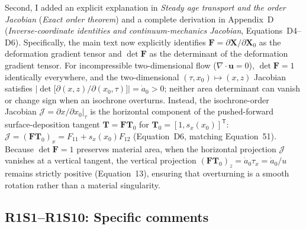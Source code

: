 \documentclass[11pt]{article}
\newcommand{\response}[1]{\noindent\textcolor{responseblue}{#1}}
\begin{document}
\medskip

\response{Second, I added an explicit explanation in \emph{Steady age transport and the order Jacobian} (\emph{Exact order theorem}) and a complete derivation in Appendix~D (\emph{Inverse-coordinate identities and continuum-mechanics Jacobian}, Equations~D4--D6). Specifically, the main text now explicitly identifies \(\bm{F}=\partial\bm{X}/\partial\bm{X}_0\) as the deformation gradient tensor and \(\det\bm{F}\) as the determinant of the deformation gradient tensor. For incompressible two-dimensional flow (\(\nabla\cdot\bm{u}=0\)), \(\det\bm{F}=1\) identically everywhere, and the two-dimensional \((\tau,x_0)\mapsto(x,z)\) Jacobian satisfies \(\left|\det\bigl[\partial(x,z)/\partial(x_0,\tau)\bigr]\right|=\dot a_0>0\); neither area determinant can vanish or change sign when an isochrone overturns. Instead, the isochrone-order Jacobian \(\mathcal{J}=\left.\partial x/\partial x_0\right|_{\tau}\) is the horizontal component of the pushed-forward surface-deposition tangent \(\bm{T}=\bm{F}\bm{T}_0\) for \(\bm{T}_0=[1,s_x(x_0)]^{\mathsf T}\): \(\mathcal{J}=(\bm{F}\bm{T}_0)_x=F_{11}+s_x(x_0)F_{12}\) (Equation~D6, matching Equation~51). Because \(\det\bm{F}=1\) preserves material area, when the horizontal projection \(\mathcal{J}\) vanishes at a vertical tangent, the vertical projection \((\bm{F}\bm{T}_0)_z=\dot a_0\tau_x=\dot a_0/u\) remains strictly positive (Equation~13), ensuring that overturning is a smooth rotation rather than a material singularity.}

\subsection*{R1S1--R1S10: Specific comments}
\end{document}
